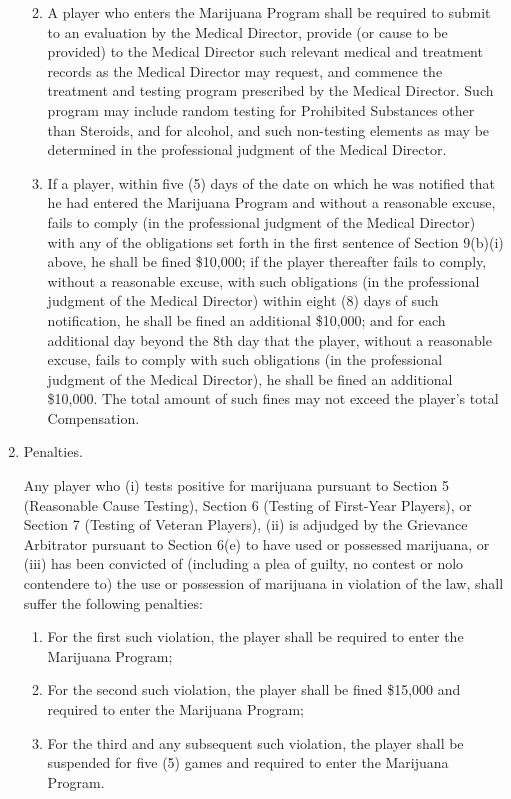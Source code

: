 \documentclass[
]{book}
\providecommand{\tightlist}{%
  \setlength{\itemsep}{0pt}\setlength{\parskip}{0pt}}
\begin{document}
\begin{enumerate}
  \begin{enumerate}
  \def\labelenumii{(\roman{enumii})}
  \tightlist
  \item
    A player who enters the Marijuana Program shall be required to submit to an evaluation by the Medical Director, provide (or cause to be provided) to the Medical Director such relevant medical and treatment records as the Medical Director may request, and commence the treatment and testing program prescribed by the Medical Director. Such program may include random testing for Prohibited Substances other than Steroids, and for alcohol, and such non-testing elements as may be determined in the professional judgment of the Medical Director.
  \item
    If a player, within five (5) days of the date on which he was notified that he had entered the Marijuana Program and without a reasonable excuse, fails to comply (in the professional judgment of the Medical Director) with any of the obligations set forth in the first sentence of Section 9(b)(i) above, he shall be fined \$10,000; if the player thereafter fails to comply, without a reasonable excuse, with such obligations (in the professional judgment of the Medical Director) within eight (8) days of such notification, he shall be fined an additional \$10,000; and for each additional day beyond the 8th day that the player, without a reasonable excuse, fails to comply with such obligations (in the professional judgment of the Medical Director), he shall be fined an additional \$10,000. The total amount of such fines may not exceed the player's total Compensation.
  \end{enumerate}
\item
  Penalties.

  Any player who (i) tests positive for marijuana pursuant to Section 5 (Reasonable Cause Testing), Section 6 (Testing of First-Year Players), or Section 7 (Testing of Veteran Players), (ii) is adjudged by the Grievance Arbitrator pursuant to Section 6(e) to have used or possessed marijuana, or (iii) has been convicted of (including a plea of guilty, no contest or nolo contendere to) the use or possession of marijuana in violation of the law, shall suffer the following penalties:

  \begin{enumerate}
  \def\labelenumii{(\Alph{enumii})}
  \tightlist
  \item
    For the first such violation, the player shall be required to enter the Marijuana Program;
  \item
    For the second such violation, the player shall be fined \$15,000 and required to enter the Marijuana Program;
  \item
    For the third and any subsequent such violation, the player shall be suspended for five (5) games and required to enter the Marijuana Program.
  \end{enumerate}
\end{enumerate}
\end{document}

